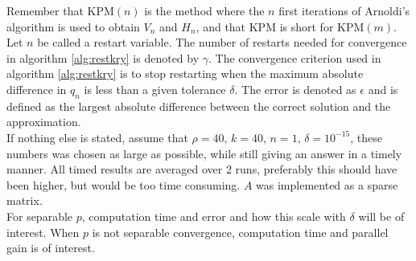 Remember that KPM$(n)$ is the method where the $n$ first iterations of Arnoldi's algorithm is used to obtain $V_n$ and $H_n$, and that KPM is short for KPM$(m)$. Let $n$ be called a restart variable. The number of restarts needed for convergence in algorithm \ref{alg:restkry} is denoted by $\gamma$. The convergence criterion used in algorithm \ref{alg:restkry} is to stop restarting when the maximum absolute difference in $q_n$ is less than a given tolerance $\delta$. The error is denoted as $\epsilon$ and is defined as the largest absolute difference between the correct solution and the approximation. \\

If nothing else is stated, assume that $\rho =40$, $k = 40$, $n = 1$, $\delta = 10^{-15}$, these numbers was chosen as large as possible, while still giving an answer in a timely manner. All timed results are averaged over 2 runs, preferably this should have been higher, but would be too time consuming. $A$ was implemented as a sparse matrix.\\
 
For separable $p$, computation time and error and how this scale with $\delta$ will be of interest. When $p$ is not separable convergence, computation time and parallel gain is of interest. \\



